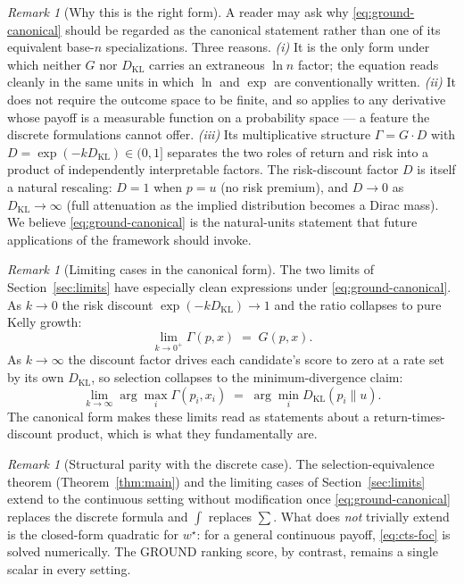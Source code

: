 \documentclass[11pt]{article}
\theoremstyle{definition}
\theoremstyle{remark}
\newtheorem{remark}[theorem]{Remark}
\newcommand{\KL}{D_{\mathrm{KL}}}
\begin{document}
\begin{remark}[Why this is the right form]\label{rem:why-canonical}
A reader may ask why \eqref{eq:ground-canonical} should be regarded
as the canonical statement rather than one of its equivalent
base-$n$ specializations. Three reasons.
\emph{(i)} It is the only form under which neither $G$ nor $\KL$
carries an extraneous $\ln n$ factor; the equation reads cleanly in
the same units in which $\ln$ and $\exp$ are conventionally written.
\emph{(ii)} It does not require the outcome space to be finite, and
so applies to any derivative whose payoff is a measurable function on
a probability space --- a feature the discrete formulations cannot
offer.
\emph{(iii)} Its multiplicative structure $\Gamma = G \cdot D$ with
$D = \exp(-k \KL) \in (0, 1]$ separates the two roles of return and
risk into a product of independently interpretable factors. The
risk-discount factor $D$ is itself a natural rescaling: $D = 1$ when
$p = u$ (no risk premium), and $D \to 0$ as $\KL \to \infty$ (full
attenuation as the implied distribution becomes a Dirac mass). We
believe \eqref{eq:ground-canonical} is the natural-units statement
that future applications of the framework should invoke.
\end{remark}

\begin{remark}[Limiting cases in the canonical form]
\label{rem:limits-canonical}
The two limits of Section~\ref{sec:limits} have especially clean
expressions under \eqref{eq:ground-canonical}. As $k \to 0$ the risk
discount $\exp(-k \KL) \to 1$ and the ratio collapses to pure Kelly
growth:
\begin{equation*}
\lim_{k \to 0^+} \Gamma(p, x) \;=\; G(p, x).
\end{equation*}
As $k \to \infty$ the discount factor drives each candidate's score
to zero at a rate set by its own $\KL$, so selection collapses to
the minimum-divergence claim:
\begin{equation*}
\lim_{k \to \infty} \arg\max_i \Gamma(p_i, x_i)
   \;=\; \arg\min_i \KL(p_i \| u).
\end{equation*}
The canonical form makes these limits read as statements about a
return-times-discount product, which is what they fundamentally are.
\end{remark}

\begin{remark}[Structural parity with the discrete case]
The selection-equivalence theorem (Theorem~\ref{thm:main}) and the
limiting cases of Section~\ref{sec:limits} extend to the continuous
setting without modification once \eqref{eq:ground-canonical}
replaces the discrete formula and $\int$ replaces $\sum$. What does
\emph{not} trivially extend is the closed-form quadratic for
$w^\star$: for a general continuous payoff, \eqref{eq:cts-foc} is
solved numerically. The GROUND ranking score, by contrast, remains
a single scalar in every setting.
\end{remark}
\end{document}
